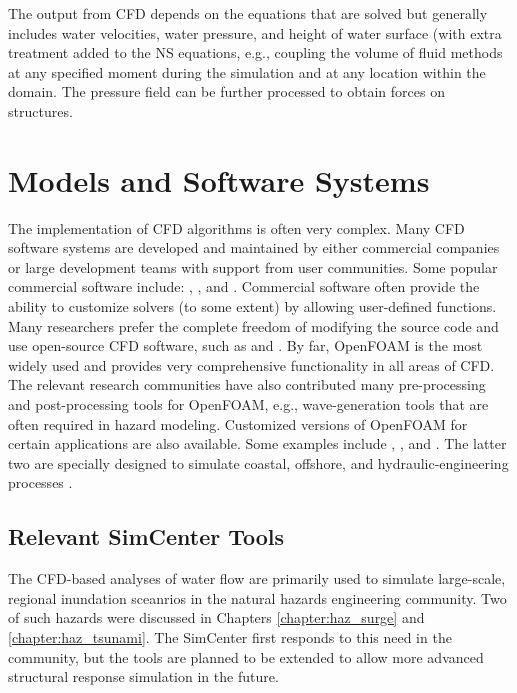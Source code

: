 The output from CFD depends on the equations that are solved but generally includes water velocities, water pressure, and height of water surface (with extra treatment added to the NS equations, e.g., coupling the volume of fluid methods \citep{Brackbill1992VOF, Hirt1981VOF, Jasak1996VOF, Ubbink1997VOF, Ubbink2002VOF} at any specified moment during the simulation and at any location within the domain. The pressure field can be further processed to obtain forces on structures.

\section{Models and Software Systems}
\label{sec:resp_cfd_water_methods}

The implementation of CFD algorithms is often very complex. Many CFD software systems are developed and maintained by either commercial companies or large development teams with support from user communities. Some popular commercial software include: , , and . Commercial software often provide the ability to customize solvers (to some extent) by allowing user-defined functions. Many researchers prefer the complete freedom of modifying the source code and use open-source CFD software, such as  and . By far, OpenFOAM is the most widely used and provides very comprehensive functionality in all areas of CFD. The relevant research communities have also contributed many pre-processing and post-processing tools for OpenFOAM, e.g., wave-generation tools that are often required in hazard modeling. Customized versions of OpenFOAM for certain applications are also available. Some examples include , , and . The latter two are specially designed to simulate coastal, offshore, and hydraulic-engineering processes \citep{Higuera2013OlaFlow, Higuera2013bOlaFlow, Higuera2014OlaFlow, Higuera2014bOlaFlow, Higuera2015OlaFlow}.

\subsection{Relevant SimCenter Tools}

The CFD-based analyses of water flow are primarily used to simulate large-scale, regional inundation sceanrios in the natural hazards engineering community. Two of such hazards were discussed in Chapters \ref{chapter:haz_surge} and \ref{chapter:haz_tsunami}. The SimCenter first responds to this need in the community, but the tools are planned to be extended to allow more advanced structural response simulation in the future.


